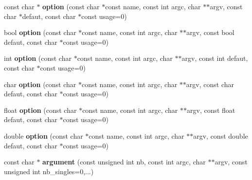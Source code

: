 \begin{DoxyCompactItemize}
\item 
\hypertarget{namespacecimg__library_1_1cimg_a6213d2df3e46cf7a2c9a5f13e48a4ee0}{const char $\ast$ {\bfseries option} (const char $\ast$const name, const int argc, char $\ast$$\ast$argv, const char $\ast$defaut, const char $\ast$const usage=0)}\label{namespacecimg__library_1_1cimg_a6213d2df3e46cf7a2c9a5f13e48a4ee0}

\item 
\hypertarget{namespacecimg__library_1_1cimg_af779848b9b9c29c99de3876e9cc1f3e3}{bool {\bfseries option} (const char $\ast$const name, const int argc, char $\ast$$\ast$argv, const bool defaut, const char $\ast$const usage=0)}\label{namespacecimg__library_1_1cimg_af779848b9b9c29c99de3876e9cc1f3e3}

\item 
\hypertarget{namespacecimg__library_1_1cimg_a282d12f4d05de0b378ddd171d6321cf9}{int {\bfseries option} (const char $\ast$const name, const int argc, char $\ast$$\ast$argv, const int defaut, const char $\ast$const usage=0)}\label{namespacecimg__library_1_1cimg_a282d12f4d05de0b378ddd171d6321cf9}

\item 
\hypertarget{namespacecimg__library_1_1cimg_a4b757cc5b4b0b18cf0172a119ae051f4}{char {\bfseries option} (const char $\ast$const name, const int argc, char $\ast$$\ast$argv, const char defaut, const char $\ast$const usage=0)}\label{namespacecimg__library_1_1cimg_a4b757cc5b4b0b18cf0172a119ae051f4}

\item 
\hypertarget{namespacecimg__library_1_1cimg_a15498c55ec48427f40c670957db9c753}{float {\bfseries option} (const char $\ast$const name, const int argc, char $\ast$$\ast$argv, const float defaut, const char $\ast$const usage=0)}\label{namespacecimg__library_1_1cimg_a15498c55ec48427f40c670957db9c753}

\item 
\hypertarget{namespacecimg__library_1_1cimg_ab12edc81400022b47ff1171658adadec}{double {\bfseries option} (const char $\ast$const name, const int argc, char $\ast$$\ast$argv, const double defaut, const char $\ast$const usage=0)}\label{namespacecimg__library_1_1cimg_ab12edc81400022b47ff1171658adadec}

\item 
\hypertarget{namespacecimg__library_1_1cimg_a18621826441073fd196094a5944ba399}{const char $\ast$ {\bfseries argument} (const unsigned int nb, const int argc, char $\ast$$\ast$argv, const unsigned int nb\-\_\-singles=0,...)}\label{namespacecimg__library_1_1cimg_a18621826441073fd196094a5944ba399}


\end{DoxyCompactItemize}
